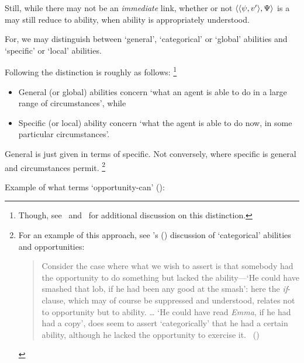 \begin{note}
  Still, while there may not be an \emph{immediate} link, whether or not \(\langle \langle \psi, v' \rangle, \Psi \rangle\) is a \fc{} may still reduce to ability, when ability is appropriately understood.

  \nocite{Maier:2018uo}
  For, we may distinguish between `general', `categorical' or `global' abilities and `specific' or `local' abilities.

  Following \textcite[2]{Whittle:2010wr} the distinction is roughly as follows:%
  \footnote{
    Though, see~\textcite[esp.\ \S4]{Kittle:2015tb} and~\textcite[1--2]{Kikkert:2022wp} for additional discussion on this distinction.
  }
  \begin{itemize}[noitemsep]
  \item
    General (or global) abilities concern `what an agent is able to do in a large range of circumstances', while
  \item
    Specific (or local) ability concern `what the agent is able to do now, in some particular circumstances'.
  \end{itemize}

  General is just given in terms of specific.
  Not conversely, where specific is general and circumstances permit.%
  \footnote{
    For an example of this approach, see \citeauthor{Austin:1961vz}'s (\citeyear{Austin:1961vz}) discussion of `categorical' abilities and opportunities:

    \begin{quote}
      Consider the case where what we wish to assert is that somebody had the opportunity to do something but lacked the ability---`He could have smashed that lob, if he had been any good at the smash':
      here the \emph{if}-clause, which may of course be suppressed and understood, relates not to opportunity but to ability.
      \dots
      `He could have read \emph{Emma}, if he had had a copy', does seem to assert `categorically' that he had a certain ability, although he lacked the opportunity to exercise it.%
      \mbox{ }\hfill\mbox{(\citeyear[177]{Austin:1961vz})}
    \end{quote}
  }

  Example of what \textcite{Hackl:1998tt} terms `opportunity-can' (\citeyear[14]{Hackl:1998tt}):


\end{note}
